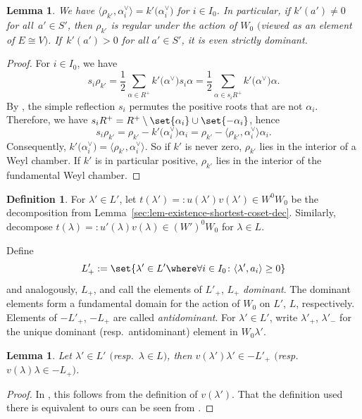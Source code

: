 \documentclass[10pt,a4paper]{amsart}
\newtheorem{Lemma}[Theorem]{Lemma}
\theoremstyle{definition}
\newtheorem{Definition}[Theorem]{Definition}
\numberwithin{equation}{section}
\begin{document}
\begin{Lemma}\label{sec:lem-rho-inner-prod}
 We have $\big\langle\rho_{k'},\alpha_i^\vee\big\rangle=k'\bigl(\alpha_i^\vee\bigr)$
 for $i\in I_0$. In particular,
 if $k'(a')\ne0$ for all~${a'\in S'}$, then $\rho_{k'}$ is regular under
 the action of $W_0$ $($viewed as an element of $E\cong V)$. If~${k'(a')>0}$ for all
 $a'\in S'$, it is even strictly dominant.
\end{Lemma}
\begin{proof}
 For $i\in I_0$, we have
 \[
 s_i \rho_{k'} = \frac{1}{2}\sum_{\alpha\in R^+} k'\bigl(\alpha^\vee\bigr)s_i\alpha
 = \frac{1}{2}\sum_{\alpha\in s_iR^+} k'\bigl(\alpha^\vee\bigr)\alpha.
 \]
 By \cite[Chapitre~VI, Section~1.6, Corollaire~1]{bourbaki}, the simple reflection $s_i$
 permutes the positive roots that are not $\alpha_i$. Therefore,
 we have $s_i R^+ = R^+\setminus\set{\alpha_i}\cup\set{-\alpha_i}$, hence
 \[
 s_i \rho_{k'} = \rho_{k'} - k'\bigl(\alpha_i^\vee\bigr) \alpha_i
 = \rho_{k'} - \big\langle \rho_{k'}, \alpha_i^\vee\big\rangle \alpha_i.
 \]
 Consequently, $k'\bigl(\alpha_i^\vee\bigr)=\langle\rho_{k'},\alpha_i^\vee\rangle$. So if
 $k'$ is never zero, $\rho_{k'}$ lies in the interior of a Weyl chamber. If $k'$
 is in particular positive, $\rho_{k'}$ lies in the interior of the fundamental
 Weyl chamber.
\end{proof}

\begin{Definition}
 For $\lambda'\in L'$, let $t(\lambda') =: u(\lambda')v(\lambda')\in W^0W_0$ be the decomposition from Lemma~\ref{sec:lem-existence-shortest-coset-dec}. Similarly, decompose $t(\lambda) =: u'(\lambda)v(\lambda)\in (W')^0W_0$
 for $\lambda\in L$.
\end{Definition}

 Define
 \[
 L'_+:=\set{\lambda'\in L'\where\forall i\in I_0\colon \langle\lambda',a_i\rangle\ge0}
 \]
 and analogously, $L_+$, and call the elements of $L'_+$, $L_+$ \emph{dominant}. The dominant elements form a fundamental domain for
 the action of $W_0$ on $L'$, $L$, respectively. Elements of $-L'_+$, $-L_+$ are called
 \emph{antidominant}. For $\lambda'\in L'$, write $\lambda'_+$, $\lambda'_-$
 for the unique dominant (resp.\ antidominant) element in $W_0\lambda'$.

\begin{Lemma}\label{sec:lem-v-antidominant}
 Let $\lambda'\in L'$ $($resp.\ $\lambda\in L)$, then $v(\lambda')\lambda'\in -L'_+$
$($resp.\ $v(\lambda)\lambda\in -L_+)$.
\end{Lemma}
\begin{proof}
 In \cite[Section~2.4]{macdonald}, this follows from the definition of $v(\lambda')$. That the definition used there is equivalent to ours can be seen
 from \cite[Section~2.4.9]{macdonald}.
\end{proof}
\end{document}
